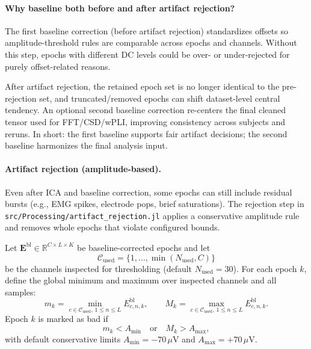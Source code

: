 \paragraph{Why baseline both before and after artifact rejection?}
The first baseline correction (before artifact rejection) standardizes offsets so amplitude-threshold rules are comparable across epochs and channels. Without this step, epochs with different DC levels could be over- or under-rejected for purely offset-related reasons.

After artifact rejection, the retained epoch set is no longer identical to the pre-rejection set, and truncated/removed epochs can shift dataset-level central tendency. An optional second baseline correction re-centers the final cleaned tensor used for FFT/CSD/wPLI, improving consistency across subjects and reruns. In short: the first baseline supports fair artifact decisions; the second baseline harmonizes the final analysis input.

\paragraph{Artifact rejection (amplitude-based).}
Even after ICA and baseline correction, some epochs can still include residual bursts (e.g., EMG spikes, electrode pops, brief saturations). The rejection step in \texttt{src/Processing/artifact\_rejection.jl} applies a conservative amplitude rule and removes whole epochs that violate configured bounds.

Let $\mathbf{E}^{\mathrm{bl}}\in\mathbb{R}^{C\times L\times K}$ be baseline-corrected epochs and let
\[
\mathcal{C}_{\mathrm{used}}=\{1,\dots,\min(N_{\mathrm{used}},C)\}
\]
be the channels inspected for thresholding (default $N_{\mathrm{used}}=30$). For each epoch $k$, define the global minimum and maximum over inspected channels and all samples:
\[
m_k=\min_{c\in\mathcal{C}_{\mathrm{used}},\,1\le n\le L}E^{\mathrm{bl}}_{c,n,k},
\qquad
M_k=\max_{c\in\mathcal{C}_{\mathrm{used}},\,1\le n\le L}E^{\mathrm{bl}}_{c,n,k}.
\]
Epoch $k$ is marked as bad if
\[
m_k<A_{\min}\quad\text{or}\quad M_k>A_{\max},
\]
with default conservative limits $A_{\min}=-70\,\mu\mathrm{V}$ and $A_{\max}=+70\,\mu\mathrm{V}$.

